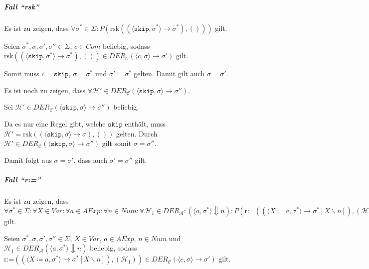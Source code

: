 			    \subparagraph{Fall \enquote{rsk}}
				    Es ist zu zeigen, dass $ \forall \sigma ^ * \in \Sigma : P(\text{rsk}((\langle \texttt{skip}, \sigma ^ * \rangle \rightarrow \sigma ^ *), ())) $ gilt.
				    
				    Seien $ \sigma ^ *, \sigma, \sigma', \sigma'' \in \Sigma $, $ c \in \textit{Com} $ beliebig, sodass $ \text{rsk}((\langle \texttt{skip}, \sigma ^ * \rangle \rightarrow \sigma ^ *), ()) \in \textit{DER} _ \mathcal{C} (\langle c, \sigma \rangle \rightarrow \sigma') $ gilt.
				    
				    Somit muss $ c = \texttt{skip} $, $ \sigma = \sigma ^ * $ und $ \sigma' = \sigma ^ * $ gelten. Damit gilt auch $ \sigma = \sigma' $.
				    
				    Es ist noch zu zeigen, dass $ \forall \mathcal{H}' \in \textit{DER} _ \mathcal{C} (\langle \texttt{skip}, \sigma \rangle \rightarrow \sigma'') $.
				    
				    Sei $ \mathcal{H}' \in \textit{DER} _ \mathcal{C} (\langle \texttt{skip}, \sigma \rangle \rightarrow \sigma'') $ beliebig.
				    
				    Da es nur eine Regel gibt, welche $ \texttt{skip} $ enthält, muss $ \mathcal{H}' = \text{rsk}((\langle \texttt{skip}, \sigma \rangle \rightarrow \sigma), ()) $ gelten. Durch $ \mathcal{H}' \in \textit{DER} _ \mathcal{C} (\langle \texttt{skip}, \sigma \rangle \rightarrow \sigma'') $ gilt somit $ \sigma = \sigma'' $.
				    
				    Damit folgt aus $ \sigma = \sigma' $, dass auch $ \sigma' = \sigma'' $ gilt.
			    
			    \subparagraph{Fall \enquote{r:=}}
				    Es ist zu zeigen, dass $ \forall \sigma ^ * \in \Sigma : \forall X \in \textit{Var} : \forall a \in \textit{AExp} : \forall n \in \textit{Num} : \forall \mathcal{H} _ 1 \in \textit{DER} _ \mathcal{A} : (\langle a, \sigma ^ * \rangle \Downarrow n) : P(\text{r:=}((\langle X \coloneqq a, \sigma ^ * \rangle \rightarrow \sigma ^ * [X \backslash n]), (\mathcal{H} _ 1))) $ gilt.
				    
				    Seien $ \sigma ^ *, \sigma, \sigma', \sigma'' \in \Sigma $, $ X \in \textit{Var} $, $ a \in \textit{AExp} $, $ n \in \textit{Num} $ und $ \mathcal{H} _ 1 \in \textit{DER} _ \mathcal{A} (\langle a, \sigma ^ * \rangle \Downarrow n) $ beliebig, sodass $ \text{r:=}((\langle X \coloneqq a, \sigma ^ * \rangle \rightarrow \sigma ^ * [X \backslash n]), (\mathcal{H} _ 1)) \in \textit{DER} _ \mathcal{C} (\langle c, \sigma \rangle \rightarrow \sigma') $ gilt.
				    
